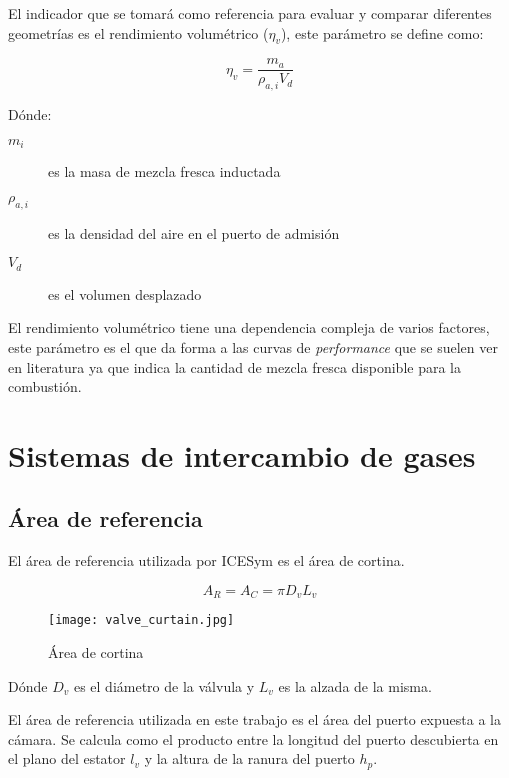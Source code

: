 El indicador que se tomará como referencia para evaluar y comparar diferentes
geometrías es el rendimiento volumétrico ($\eta_v$), este parámetro se define
como:

\begin{equation}
    \eta_v = \frac{m_a}{\rho_{a,i}V_d}
\end{equation}

Dónde:
%
\begin{description}
    \item[$m_i$] es la masa de mezcla fresca inductada
    \item[$\rho_{a,i}$] es la densidad del aire en el puerto de admisión
    \item[$V_d$] es el volumen desplazado
\end{description}

El rendimiento volumétrico tiene una dependencia compleja de varios factores,
este parámetro es el que da forma a las curvas de \emph{performance} que se
suelen ver en literatura ya que indica la cantidad de mezcla fresca disponible
para la combustión. 
%

\section{Sistemas de intercambio de gases}
%
\subsection{Área de referencia}
%
El área de referencia utilizada por ICESym es el área de cortina.

$$ A_R = A_C = \pi D_v L_v $$

\begin{figure}
  \centering
  \texttt{[image: valve\_curtain.jpg]}
  \caption{Área de cortina}
  \label{fig:area_cortina}
\end{figure}

Dónde $D_v$ es el diámetro de la válvula y $L_v$ es la alzada de la misma.

El área de referencia utilizada en este trabajo es el área del puerto expuesta
a la cámara.
%
Se calcula como el producto entre la longitud del puerto descubierta en el
plano del estator $l_v$ y la altura de la ranura del puerto $h_p$.

